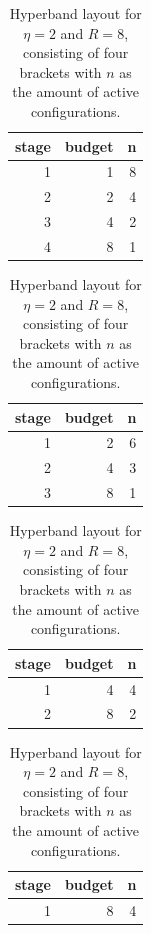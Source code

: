 \documentclass[
]{scrbook}
\begin{document}
\begin{table}
\caption{\label{tab:03-optimization-hyperband-002}Hyperband layout for $\eta = 2$ and $R = 8$, consisting of four brackets with $n$ as the amount of active configurations.}

\centering
\begin{tabular}[t]{rrr}
\toprule
stage & budget & n\\
\midrule
1 & 1 & 8\\
2 & 2 & 4\\
3 & 4 & 2\\
4 & 8 & 1\\
\bottomrule
\end{tabular}
\centering
\begin{tabular}[t]{rrr}
\toprule
stage & budget & n\\
\midrule
1 & 2 & 6\\
2 & 4 & 3\\
3 & 8 & 1\\
\bottomrule
\end{tabular}
\centering
\begin{tabular}[t]{rrr}
\toprule
stage & budget & n\\
\midrule
1 & 4 & 4\\
2 & 8 & 2\\
\bottomrule
\end{tabular}
\centering
\begin{tabular}[t]{rrr}
\toprule
stage & budget & n\\
\midrule
1 & 8 & 4\\
\bottomrule
\end{tabular}
\end{table}
\end{document}
